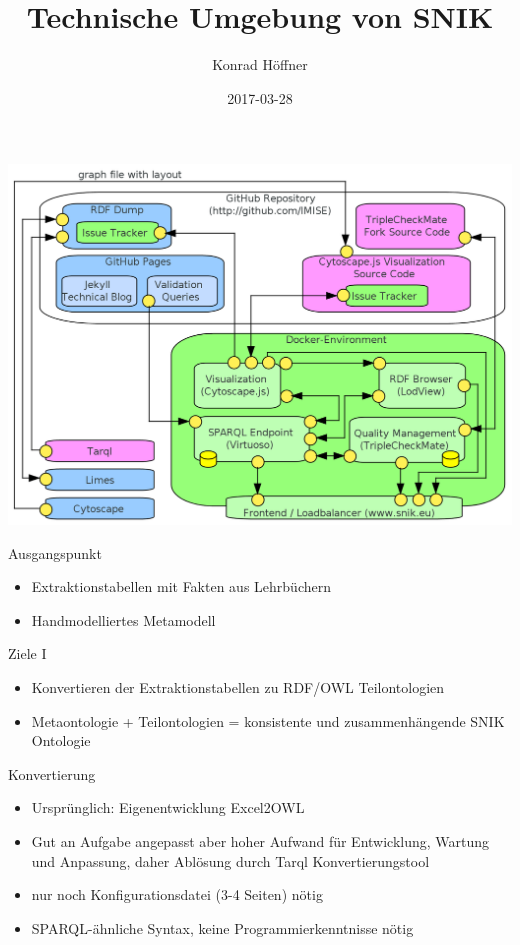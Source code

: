\documentclass{beamer}
\author{Konrad Höffner}
\date{2017-03-28}
\title{Technische Umgebung von SNIK}
\begin{document}
\begin{frame}
\titlepage
\end{frame}

\begin{frame}
\includegraphics[width=\textwidth]{img/architecture.png}
\end{frame}

\begin{frame}{Ausgangspunkt}
\begin{itemize}
\item Extraktionstabellen mit Fakten aus Lehrbüchern 
\item Handmodelliertes Metamodell
\end{itemize}
\end{frame}

\begin{frame}{Ziele I}
\begin{itemize}
\item Konvertieren der Extraktionstabellen zu RDF/OWL Teilontologien 
\item Metaontologie + Teilontologien = konsistente und zusammenhängende SNIK Ontologie 
\end{itemize}
\end{frame}

\begin{frame}{Konvertierung}
\begin{itemize}
\item Ursprünglich: Eigenentwicklung Excel2OWL 
\item Gut an Aufgabe angepasst aber hoher Aufwand für Entwicklung, Wartung und Anpassung, daher Ablösung durch Tarql Konvertierungstool
\item nur noch Konfigurationsdatei (3-4 Seiten) nötig
\item SPARQL-ähnliche Syntax, keine Programmierkenntnisse nötig
\end{itemize}
\end{frame}
\end{document}
